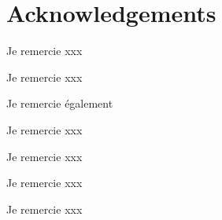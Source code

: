 \chapter*{Acknowledgements}

Je remercie xxx \lipsum[66]

\bigskip

Je remercie xxx \lipsum[66]

\bigskip

Je remercie également \lipsum[66]

\bigskip

Je remercie xxx \lipsum[66]

\bigskip

Je remercie xxx \lipsum[66]

\bigskip

Je remercie xxx \lipsum[66]

\bigskip

Je remercie xxx \lipsum[66]